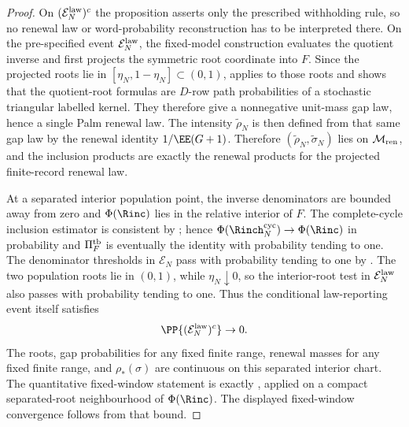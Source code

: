 \begin{proof}
On \((\mathcal E_N^{\rm law})^c\) the proposition asserts only the prescribed
withholding rule, so no renewal law or word-probability reconstruction has to be
interpreted there.  On the pre-specified event \(\mathcal E_N^{\rm law}\), the
fixed-model construction evaluates the quotient inverse and first projects
the symmetric root coordinate into \(F\).  Since the projected roots lie in
\([\eta_N,1-\eta_N]\subset(0,1)\),
 applies to those roots and shows
that the quotient-root formulas are \(D\)-row path probabilities of a
stochastic triangular labelled kernel.  They therefore give a nonnegative
unit-mass gap law, hence a single Palm renewal law.  The intensity
\(\widetilde\rho_N\) is then defined from that same gap law by the renewal
identity \(1/\EE(G+1)\).  Therefore
\((\widetilde\rho_N,\widetilde\sigma_N)\) lies on \(\mathcal M_{\rm ren}\),
and the inclusion products are exactly the renewal products for the projected
finite-record renewal law.

At a separated interior population point, the inverse denominators are bounded
away from zero and \(\Phi(\Rinc)\) lies in the relative interior of \(F\).  The
complete-cycle inclusion estimator is consistent by
; hence
\(\Phi(\Rinch_N^{\mathrm{cyc}})\to\Phi(\Rinc)\) in probability and
\(\Pi_F^{\rm tb}\) is eventually the identity with probability tending to
one.  The denominator thresholds in \(\mathcal E_N\) pass with probability
tending to one by .  The two
population roots lie in \((0,1)\), while \(\eta_N\downarrow0\), so the
interior-root test in \(\mathcal E_N^{\rm law}\) also passes with probability
tending to one.  Thus the conditional law-reporting event itself satisfies
\[
\PP\{(\mathcal E_N^{\rm law})^c\}\to0 .
\]
The
roots, gap probabilities for any fixed finite range, renewal masses for any
fixed finite range, and \(\rho_*(\sigma)\) are continuous on this separated
interior chart.  The quantitative fixed-window statement is exactly
, applied on a compact
separated-root neighbourhood of \(\Phi(\Rinc)\).  The displayed fixed-window
convergence follows from that bound.
\end{proof}

